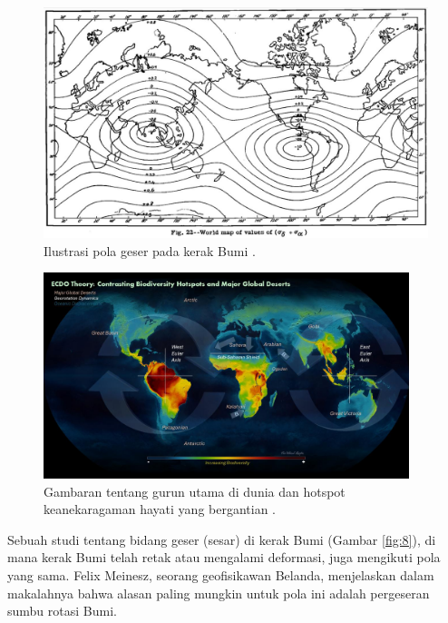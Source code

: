 \documentclass[10pt,twocolumn,letterpaper]{article}
\begin{document}
\begin{figure}[t]
\begin{center}
   \includegraphics[width=1\linewidth]{meinesz3.jpg}
\end{center}
   \caption{Ilustrasi pola geser pada kerak Bumi \cite{36}.}
\label{fig:8}
\label{fig:onecol}
\end{figure}
\begin{figure}[t]
\begin{center}
\includegraphics[width=0.95\textwidth]{biodiversity.jpg}
\end{center}
   \caption{Gambaran tentang gurun utama di dunia dan hotspot keanekaragaman hayati yang bergantian \cite{28}.}
\label{fig:9}
\end{figure}

Sebuah studi tentang bidang geser (sesar) di kerak Bumi (Gambar \ref{fig:8}), di mana kerak Bumi telah retak atau mengalami deformasi, juga mengikuti pola yang sama. Felix Meinesz, seorang geofisikawan Belanda, menjelaskan dalam makalahnya \cite{36} bahwa alasan paling mungkin untuk pola ini adalah pergeseran sumbu rotasi Bumi.
\end{document}
